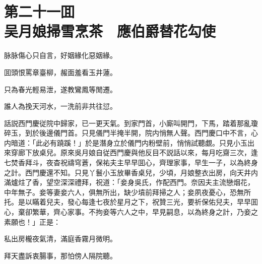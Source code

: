 
\chapter*{第二十一囬　\\吴月娘掃雪烹茶　應伯爵替花勾使}


\begin{myquote}
脉脉傷心只自言，好姻緣化惡姻緣。

囬頭恨罵章臺柳，赧面羞看玉井蓮。

只為春光輕易泄，遂教鸞鳳等閒遷。

誰人為挽天河水，一洗前非共往愆。
\end{myquote}

話説西門慶従院中歸家，已一更天氣。到家門首，小廝叫開門，下馬，踏着那亂瓊碎玉，到於後邊儀門首。只見儀門半掩半開，院内悄無人聲。西門慶口中不言，心内暗道：「此必有蹺蹊！」於是潛身立於儀門内粉壁前，悄悄試聽覷。只見小玉出來穿廊下放桌兒。原來吳月娘自従西門慶與他反目不説話以來，每月吃齋三次，逢七焚香拜斗，夜杳祝禱穹蒼，保祐夫主早早囬心，齊理家事，早生一子，以為終身之計。西門慶還不知。只見丫鬟小玉放畢香桌兒，少頃，月娘整衣出房，向天井内滿爐炷了香，望空深深禮拜，祝道：「妾身吳氏，作配西門。奈因夫主流戀烟花，中年無子。妾等妻妾六人，俱無所出，缺少墳前拜掃之人；妾夙夜憂心，恐無所托。是以瞞着兒夫，發心每逢七夜於星月之下，祝贊三光，要祈保佑兒夫，早早囬心，棄卻繁華，齊心家事。不拘妾等六人之中，早見嗣息，以為終身之計，乃妾之素願也！」正是：

\begin{myquote}
私出房櫳夜氣清，滿庭香霧月微明。

拜天盡訴衷腸事，那怕傍人隔院聽。
\end{myquote}

